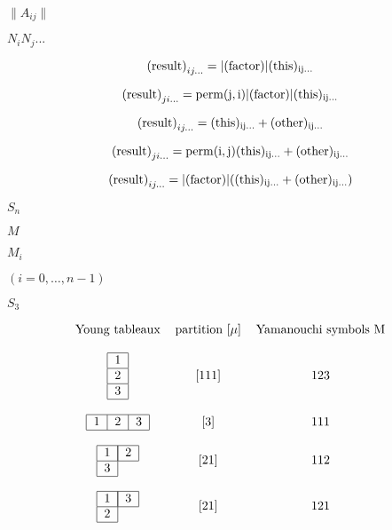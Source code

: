 \documentclass{article}
\begin{document}
$\|A_{ij}\|$
\pagebreak

$N_i N_j ...$
\pagebreak

\[ {(\rm{result})}_{ij...} = |(\rm{factor})| (\rm{this})_{ij...} \]
\pagebreak

\[ {(\rm{result})}_{ji...} = \rm{perm}(j,i) |(\rm{factor})| (\rm{this})_{ij...} \]
\pagebreak

\[ {(\rm{result})}_{ij...} = (\rm{this})_{ij...} + (\rm{other})_{ij...} \]
\pagebreak

\[ {(\rm{result})}_{ji...} = \rm{perm}(i,j) (\rm{this})_{ij...} + (\rm{other})_{ij...} \]
\pagebreak

\[ {(\rm{result})}_{ij...} = |(\rm{factor})| ((\rm{this})_{ij...} + (\rm{other})_{ij...}) \]
\pagebreak

$ S_n $
\pagebreak

$ M $
\pagebreak

$ M_i $
\pagebreak

$ (i = 0, \dots , n-1) $
\pagebreak

$ S_3 $
\pagebreak

\[ \begin{tabular}{ c c c } Young tableaux & partition [$\mu$] & Yamanouchi symbols M \\ & & \\ \begin{tabular}{ |c| } \hline 1 \\ \hline 2 \\ \hline 3 \\ \hline \end{tabular} & [111] & 123 \\ & & \\ \begin{tabular}{ |c|c|c| } \hline 1 & 2 & 3 \\ \hline \end{tabular} & [3] & 111 \\ & & \\ \begin{tabular}{ |c|c } \hline 1 & \multicolumn{1}{|c|}{2} \\ \hline 3 \\ \cline{1-1} \end{tabular} & [21] & 112 \\ & & \\ \begin{tabular}{ |c|c } \hline 1 & \multicolumn{1}{|c|}{3} \\ \hline 2 \\ \cline{1-1} \end{tabular} & [21] & 121 \\ \end{tabular} \]
\pagebreak
\end{document}
